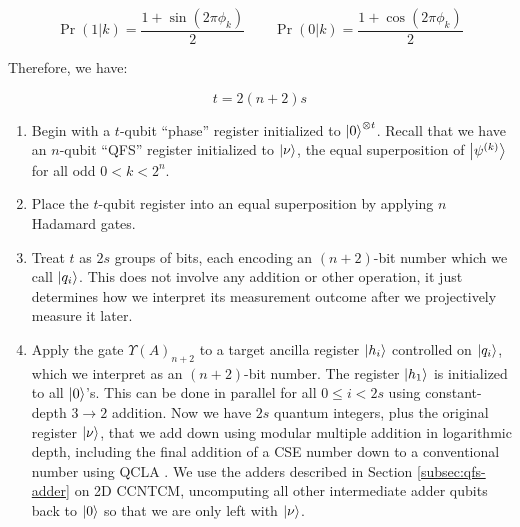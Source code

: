 \begin{equation}
\Pr(1|k) = \frac{1 + \sin(2\pi\phi_k)}{2} \qquad \Pr(0|k) = \frac{1 + \cos(2\pi\phi_k)}{2}
\end{equation}

Therefore, we have:

\begin{equation}
t = 2(n+2)s
\end{equation}

\begin{enumerate}

\item Begin with a $t$-qubit ``phase'' register initialized to $\left\vert{0}\right\rangle^{\otimes t}$.
Recall that we have an $n$-qubit ``QFS'' register initialized to $\left\vert{\nu}\right\rangle$, the
equal superposition of $\left\vert{\psi^{(k)}}\right\rangle$ for all odd $0 < k  < 2^n$.

\item Place the $t$-qubit register into an equal superposition by
applying $n$ Hadamard gates.

\item Treat $t$ as $2s$ groups of bits, each encoding an $(n+2)$-bit number
which we call $\left\vert{q_i}\right\rangle$.
This does not involve any addition or other operation, it just determines
how we interpret its measurement outcome after we projectively measure it later.

\item Apply the gate $\Upsilon(A)_{n+2}$ to a target ancilla register $\left\vert{h_i}\right\rangle$ controlled
on $\left\vert{q_i}\right\rangle$, which we interpret as an $(n+2)$-bit number. The register
$\left\vert{h_1}\right\rangle$ is initialized to all $\left\vert{0}\right\rangle$'s. This can be done in
parallel for all $0 \le i < 2s$ using constant-depth $3\rightarrow 2$ addition.
Now we have $2s$ quantum integers, plus
the original register $\left\vert{\nu}\right\rangle$, that we add down using modular multiple
addition in logarithmic depth, including the final addition of a CSE number
down to a conventional number using QCLA \cite{Draper2004}. We use the adders described
in Section \ref{subsec:qfs-adder} on \textsf{2D CCNTCM}, uncomputing all
other intermediate adder qubits back to $\left\vert{0}\right\rangle$
so that we are only left with $\left\vert{\nu}\right\rangle$.


\end{enumerate}

